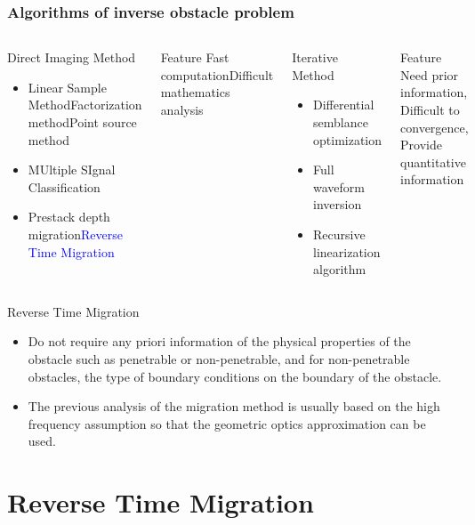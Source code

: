 \documentclass[utf-8,8pt]{beamer}
\begin{document}
\begin{frame}
\frametitle{Algorithms of inverse obstacle problem}
\begin{columns}


\begin{block}{Direct Imaging Method}
\begin{itemize}
  \item Linear Sample MethodFactorization methodPoint source method
  \item MUltiple SIgnal Classification
  \item Prestack depth migration\textcolor{blue}{Reverse Time Migration}
\end{itemize}

\end{block}
\begin{block}{Feature}
  Fast computationDifficult mathematics analysis
\end{block}

\begin{block}{Iterative Method}
\begin{itemize}
  \item Differential semblance optimization
  \item Full waveform inversion
  \item Recursive linearization  algorithm
\end{itemize}
\end{block}
\begin{block}{Feature}
 Need prior information, Difficult to convergence, Provide quantitative information
\end{block}
\end{columns}
\begin{block}{Reverse Time Migration}
 \begin{itemize}
 \item Do not require any priori information
of the physical properties of the obstacle such as penetrable or non-penetrable, and
for non-penetrable obstacles, the type of boundary conditions on the boundary of the
obstacle.
  \item The previous analysis of the migration
method is usually based on the high frequency assumption so that the geometric optics
approximation can be used.
\end{itemize}
\end{block}
\end{frame}

\section{Reverse Time Migration}
\end{document}
